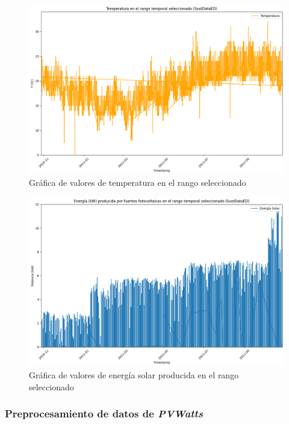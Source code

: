 \begin{figure}[h!]
  \centering
  \includegraphics[width=1\textwidth]{img/diseno/temp.png}
  \caption{Gráfica de valores de temperatura en el rango seleccionado}
  \label{fig:temp}
\end{figure}

\vspace{3mm}

\begin{figure}[h!]
  \centering
  \includegraphics[width=1\textwidth]{img/diseno/matplotsolaryear.png}
  \caption{Gráfica de valores de energía solar producida en el rango seleccionado}
  \label{fig:solaryear}
\end{figure}

\subsubsection{Preprocesamiento de datos de \textit{PVWatts}}
\label{sec:preprocpvwatts}


